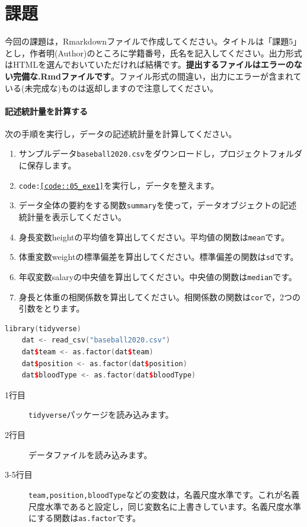 \documentclass{ltjbook}
\begin{document}
\section{課題}
今回の課題は，Rmarkdownファイルで作成してください。タイトルは「課題5」とし，作者明(Author)のところに学籍番号，氏名を記入してください。出力形式はHTMLを選んでおいていただければ結構です。\textbf{提出するファイルはエラーのない完備な.Rmdファイルです}。ファイル形式の間違い，出力にエラーが含まれている(未完成な)ものは返却しますので注意してください。
\paragraph{記述統計量を計算する}次の手順を実行し，データの記述統計量を計算してください。

\begin{enumerate}
	\item サンプルデータ\texttt{baseball2020.csv}をダウンロードし，プロジェクトフォルダに保存します。
	\item \texttt{code:\ref{code::05_exe1}}を実行し，データを整えます。
	\item データ全体の要約をする関数\verb|summary|を使って，データオブジェクトの記述統計量を表示してください。
	\item 身長変数heightの平均値を算出してください。平均値の関数は\verb|mean|です。
	\item 体重変数weightの標準偏差を算出してください。標準偏差の関数は\verb|sd|です。
	\item 年収変数salaryの中央値を算出してください。中央値の関数は\verb|median|です。
	\item 身長と体重の相関係数を算出してください。相関係数の関数は\verb|cor|で，2つの引数をとります。
\end{enumerate}

\begin{lstlisting}[language=c++,label={code::05_exe1},caption={データの読み込みと整え}]
	library(tidyverse)
	dat <- read_csv("baseball2020.csv")
	dat$team <- as.factor(dat$team)
	dat$position <- as.factor(dat$position)
	dat$bloodType <- as.factor(dat$bloodType)
\end{lstlisting}

\begin{description}
    \item[1行目] \texttt{tidyverse}パッケージを読み込みます。
	\item[2行目] データファイルを読み込みます。
	\item[3-5行目] \texttt{team,position,bloodType}などの変数は，名義尺度水準です。これが名義尺度水準であると設定し，同じ変数名に上書きしています。名義尺度水準にする関数は\texttt{as.factor}です。
\end{description}
\end{document}
